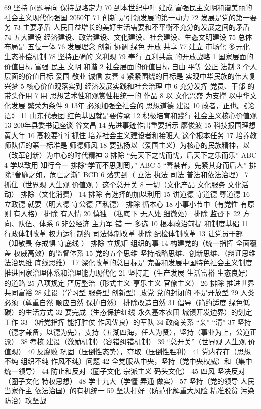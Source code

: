 \documentclass[cyan]{elegantnote}
\begin{document}
69 坚持 问题导向 保持战略定力
70 到本世纪中叶 建成 富强民主文明和谐美丽的社会主义现代化强国 2050年
71 创新 是引领发展的第一动力
72 发展是党的第一要务
73 主要矛盾
 人民日益增长的美好生活需要和不平衡不充分的发展之间的矛盾
74 五大建设
经济建设、政治建设、文化建设、社会建设、生态文明建设
75 总体布局是 五位一体
76 发展理念
创新 协调 绿色 开放 共享
77 建立 市场化 多元化 生态补偿机制
78 坚持正确的 义利观
79 奉行 互利共赢 的开放战略
1 国家层面的价值目标
富强 民主 文明 和谐
2 社会层面的价值目标
自由 平等 公正 法制
3 个人层面的价值目标
爱国 敬业 诚信 友善
4 紧紧围绕的目标是
实现中华民族的伟大复兴梦
5 核心价值观落实到
经济发展实践和社会治理 中
6 充分发挥 党员、干部 的带头作用
7 用 思想艺术性和观赏性相统一的 作品
8 以 文化兴盛 为支撑 以中华文化发展 繁荣为条件
9 13年 必须加强全社会的 思想道德 建设
10 政者，正也。《论语》
11 山东代表团 红色基因就是要传承
12 积极培育和践行 社会主义核心价值观
13 200年县委书记座谈 谷文昌
14 先进事迹作出重要指示 廖俊波
15 科技报国理想 黄大年
16 高校要牢牢抓住 培养社会主义建设者和接班人 这个根本任务
17 培养教师队伍的第一标准是 师德师风
18 要弘扬以（爱国主义）为核心的民族精神，以（改革创新）为中心的时代精神
3 排除 “先天下之忧而忧，后天下之乐而乐” ABC
4 学以致用 知行合一
排除“学而不思则罔，” ABC
5 “善禁者，先紧其身而后人”
排除“奢靡之如，危亡之渐”
BCD
6 落实到（ 立法 执法 司法 普法和依法治理）
7 抓住（世界观 人生观 价值观 ）这个总开关
8 一切（文化产品 文化服务 文化活动） 排除（文化消费）
14 排除 有选择的加以利用
15 讲道德 守道德 尊道德
16 立政德 就要（明大德 守公德 严私德）
排除 循本心
18 小事小节中（有党性 有原则 有人格）
排除 有人情
20 慎独 （私底下 无人处 细微处）
排除 监督下
22 方向、队伍、体系
6 非公经济 主力军 错
一 多选
10 根本政治前提 和制度基础
11 行政体制改革 权力运行制约 司法体制改革
排除 纪检体制改革
13 让党员干部 （知敬畏 存戒惧 守底线 ）
排除 立规矩 组织的事
14 构建党的（统一指挥 全面覆盖 权威高效）的监督体系
15 党的五个思维 坚持战略思维、创新思维、（辩证思维 法治思维 底线思维）
17 深化改革的总目标是
完善和发展中国特色社会主义制度
推进国家治理体系和治理能力现代化
21 坚持走（生产发展 生活富裕 生态良好）的道路
25 八项规定 严厉整治（形式主义 享乐主义 官僚主义）
26 排除 推进世界共同富裕
28 建设（学习型 服务型 创新型）政党
党的封闭的 不是开放型
29 人类必须（尊重自然 顺应自然 保护自然）
排除改造自然
31 倡导（简约适度 绿色低碳）的生活方式
32 要完成（生态保护红线 永久基本农田 城镇开发边界）的划定工作
33 （听党指挥 能打胜仗 作风优良）的军队
34 政商关系 “亲” “清”
37 坚持（德才兼备，以德为先），支持（五湖四海，任人为贤），坚持（事业为上，公道正派）
38 考核 建设（激励机制）（容错纠错机制）
39 “总开关”（世界观 人生观 价值观）
40 反腐败 巩固（压倒性态势），夺取（压倒性胜利）
41 党内存在（思想不纯 组织不纯 作风不纯）问题
42 全党服从中央，坚持（党中央权威）和（集中统一领导）
44 防止和反对（圈子文化 宗派主义 码头文化）
45 四风 坚决反对（圈子文化 特权思想）
48 学十九大（学懂 弄通 做实）
57 坚持（党的领导 人民当家作主 依法治国）的有机统一
59 坚决打好（防范化解重大风险 精准脱贫 污染防治）攻坚战
\end{document}
